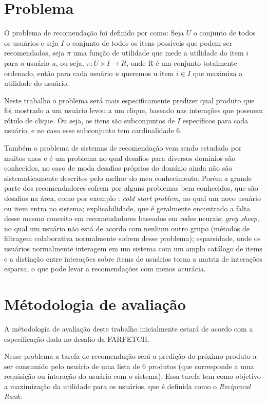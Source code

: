 \documentclass{article}
\begin{document}
\section{Problema}

O problema de recomendação foi definido por \citeauthor{burke2011recommender} como: Seja $U$ o conjunto de todos os usuários e seja $I$ o conjunto de todos os itens possíveis que podem ser recomendados, seja $\pi$ uma função de utilidade que mede a utilidade do item $i$ para o usuário $u$, ou seja, $\pi: U \times I \rightarrow R$, onde R é um conjunto totalmente ordenado, então para cada usuário $u$ queremos u item $i \in I$ que maximiza a utilidade do usuário.

Neste trabalho o problema será mais especificamente predizer qual produto que foi mostrado a um usuário levou a um clique, baseado nas interações que possuem rótulo de clique. Ou seja, os itens são subconjuntos de $I$ específicos para cada usuário, e no caso esse subconjunto tem cardinalidade 6.

Também o problema de sistemas de recomendação vem sendo estudado por muitos anos e é um problema no qual desafios para diversos domínios são conhecidos, no caso de moda desafios próprios do domínio ainda não são sistematicamente descritos pelo melhor do meu conhecimento. Porém a grande parte dos recomendadores sofrem por alguns problemas bem conhecidos, que são desafios na área, como por exemplo \cite{khusro2016recommender}: \textit{cold start problem}, no qual um novo usuário ou item entra no sistema; explicabilidade, que é geralmente encontrado a falta desse mesmo conceito em recomendadores baseados em redes neurais; \textit{grey sheep}, no qual um usuário não está de acordo com nenhum outro grupo (métodos de filtragem colaborativa normalmente sofrem desse problema); esparsidade, onde os usuários normalmente interagem em um sistema com um amplo catálogo de items e a distinção entre interações sobre items de usuários torna a matriz de interações esparsa, o que pode levar a recomendações com menos acurácia.


\section{Métodologia de avaliação}

A métodologia de avaliação deste trabalho inicialmente estará de acordo com a específicação dada no desafio da FARFETCH.

Nesse problema a tarefa de recomendação será a predição do próximo produto a ser consumido pelo usuário de uma lista de 6 produtos (que corresponde a uma requisição ou interação do usuário com o sistema). Essa tarefa tem como objetivo a maximização da utilidade para os usuários, que é definida como o \textit{Reciprocal Rank}.
\end{document}
